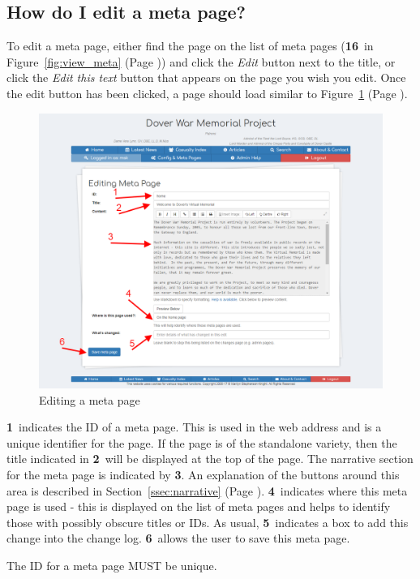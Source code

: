 \documentclass[12pt]{article}
\newcommand{\marker}[1]{\color{red}\textbf{#1}\color{black}}
\newcommand{\myref}[1]{\ref{#1} {\scriptsize(Page \pageref{#1})}}
\begin{document}
\newpage
\FloatBarrier
\subsection{How do I edit a meta page?}
To edit a meta page, either find the page on the list of meta pages (\marker{16}\ in Figure~\myref{fig:view_meta}) and click the \textit{Edit} button next to the title, or click the \textit{Edit this text} button that appears on the page you wish you edit. Once the edit button has been clicked, a page should load similar to Figure~\myref{fig:edit_meta}.

\begin{figure}[h]
  \centering
 \includegraphics[width=.9\textwidth]{pics/edit_meta.png}
	\caption{Editing a meta page}\label{fig:edit_meta}
\end{figure}

\marker{1}\ indicates the ID of a meta page. This is used in the web address and is a unique identifier for the page. If the page is of the standalone variety, then the title indicated in \marker{2}\ will be displayed at the top of the page. The narrative section for the meta page is indicated by \marker{3}. An explanation of the buttons around this area is described in Section~\myref{ssec:narrative}. \marker{4}\ indicates where this meta page is used - this is displayed on the list of meta pages and helps to identify those with possibly obscure titles or IDs. As usual, \marker{5}\ indicates a box to add this change into the change log. \marker{6}\ allows the user to save this meta page.

\begin{warningBox}
The ID for a meta page MUST be unique.
\end{warningBox}
\end{document}
